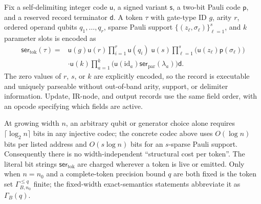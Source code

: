 \begin{definition}
\label{def:token-codec}
Fix a self-delimiting integer code $\mathsf u$, a signed variant
$\mathsf s$, a two-bit Pauli code $\mathsf p$, and a reserved record
terminator $\mathsf d$.  A token $\tau$ with gate-type ID $g$, arity $r$,
ordered operand qubits $q_1,\ldots,q_r$, sparse Pauli support
$\{(z_\ell,\sigma_\ell)\}_{\ell=1}^{s}$, and $k$ parameter slots is encoded
as
\begin{equation*}
\begin{aligned}
\mathsf{ser}_{\mathrm{tok}}(\tau)
={}&\mathsf u(g)\mathsf u(r)
  \prod_{i=1}^{r}\mathsf u(q_i)\;\mathsf u(s)
  \prod_{\ell=1}^{s}
    \bigl(\mathsf u(z_\ell)\mathsf p(\sigma_\ell)\bigr)\\
 &\cdot\mathsf u(k)
  \prod_{a=1}^{k}
    \bigl(\mathsf u(\mathrm{id}_a)
           \mathsf{ser}_{\mathrm{par}}(\lambda_a)\bigr)\mathsf d .
\end{aligned}
\end{equation*}
The zero values of $r$, $s$, or $k$ are explicitly encoded, so the record is
executable and uniquely parseable without out-of-band arity, support, or
delimiter information.  Update, IR-node, and output records use the same
field order, with an opcode specifying which fields are active.

At growing width $n$, an arbitrary qubit or generator choice alone requires
$\lceil\log_2 n\rceil$ bits in any injective codec; the concrete codec above
uses $O(\log n)$ bits per listed address and $O(s\log n)$ bits for an
$s$-sparse Pauli support.  Consequently there is no width-independent
``structural cost per token''.  The literal bit strings
$\mathsf{ser}_{\mathrm{tok}}$ are charged wherever a token is live or
emitted.  Only when $n=n_0$ and a complete-token precision bound $q$ are
both fixed is the token set $\Gamma_{B,n_0}^{\leq q}$ finite; the
fixed-width exact-semantics statements abbreviate it as $\Gamma_B(q)$.
\end{definition}

